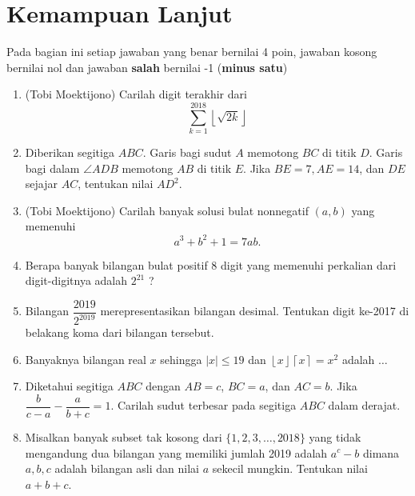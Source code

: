 \documentclass[11pt]{scrartcl}
\begin{document}
\section{Kemampuan Lanjut}
Pada bagian ini setiap jawaban yang benar bernilai 4 poin, jawaban kosong bernilai nol
dan jawaban \textbf{salah} bernilai -1 (\textbf{minus satu})

\begin{enumerate}[resume]
	\item (Tobi Moektijono)
	Carilah digit terakhir dari $$\sum_{k=1}^{2018} \left \lfloor \sqrt{2k} \right \rfloor $$
	
	\item Diberikan segitiga $ABC$. Garis bagi sudut $A$ memotong $BC$ di titik $D$. Garis bagi
	dalam $\angle ADB$ memotong $AB$ di titik $E$. Jika $BE = 7, AE = 14$, dan $DE$ sejajar $AC$,
	tentukan nilai $AD^2$.
	
	\item (Tobi Moektijono)
	Carilah banyak solusi bulat nonnegatif $(a,b)$ yang memenuhi $$a^3+b^2+1=7ab.$$
	
	\item
	Berapa banyak bilangan bulat positif 8 digit yang memenuhi perkalian dari digit-digitnya adalah $2^{21}$
	?
	
	\item Bilangan $\dfrac{2019}{2^{2019}}$ merepresentasikan bilangan desimal. Tentukan digit ke-2017 di belakang koma dari bilangan tersebut.
	
	\item Banyaknya bilangan real $x$ sehingga $|x| \le 19$ dan $\left \lfloor x \right \rfloor\left \lceil x \right \rceil = x^2$ adalah $\dots$
	
	\item Diketahui segitiga $ABC$ dengan $AB=c$, $BC=a$, dan $AC=b$. Jika $\dfrac{b}{c-a} - \dfrac{a}{b+c} = 1$. Carilah sudut terbesar pada segitiga $ABC$ dalam derajat.
	
	\item
	Misalkan banyak subset tak kosong dari $\{1,2,3,\dots,2018\}$ yang tidak mengandung dua bilangan yang memiliki jumlah 2019 adalah $a^c-b$ dimana $a,b,c$ adalah bilangan asli dan nilai $a$ sekecil mungkin. Tentukan nilai $a+b+c$.

\end{enumerate}
	
	
	
\end{document}
